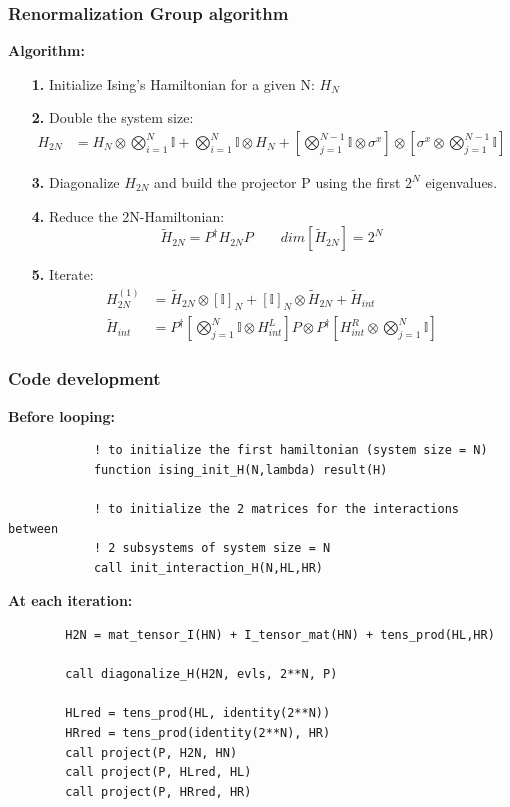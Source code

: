 \documentclass[pt12]{beamer}
\begin{document}
\begin{frame}[fragile,label=RB]
	\frametitle{Renormalization Group algorithm}
	\tableofcontents[pausesections]
	\fontsize{8pt}{10pt}\selectfont
	\textbf{Algorithm:}
	\begin{itemize}
		\item[\textbf{1.}] Initialize Ising's Hamiltonian for a given N:  $H_N$
		\item[\textbf{2.}] Double the system size:
		$$
		\begin{align}
			H_{2N} &= H_N\otimes \bigotimes_{i=1}^{N}\mathbb{I} + \bigotimes_{i=1}^{N}\mathbb{I} \otimes H_N
			       + \left[\bigotimes_{j=1}^{N-1} \mathbb{I} \otimes \sigma^x\right]\otimes\left[\sigma^x\otimes \bigotimes_{j=1}^{N-1} \mathbb{I} \right]
		\end{align}$$ 
	\item[\textbf{3.}] Diagonalize $H_{2N}$ and build the projector P using the first $2^N$ eigenvalues.
	\item[\textbf{4.}] Reduce the 2N-Hamiltonian:
	$$\tilde{H}_{2N}=P^\dagger H_{2N} P \qquad dim[\tilde{H}_{2N}] = 2^N$$
	\item[\textbf{5.}] Iterate:
	$$\begin{align}
		H_{2N}^{(1)} &= \tilde{H}_{2N} \otimes [\mathbb{I}]_N + [\mathbb{I}]_N \otimes \tilde{H}_{2N} + \tilde{H}_{int}  \\
	\tilde{H}_{int} &= P^\dagger\left[\bigotimes_{j=1}^N\mathbb{I} \otimes H^L_{int}\right]P \otimes P^\dagger\left[H^R_{int}\otimes\bigotimes_{j=1}^N\mathbb{I}\right]
	\end{align}$$
	\end{itemize}
\end{frame}

\begin{frame}[fragile,label=Code development]
	\frametitle{Code development}
	\tableofcontents[pausesections]
	\textbf{Before looping:}
		\begin{verbatim}
			! to initialize the first hamiltonian (system size = N)
			function ising_init_H(N,lambda) result(H)
			
			! to initialize the 2 matrices for the interactions between 
			! 2 subsystems of system size = N
			call init_interaction_H(N,HL,HR)
		\end{verbatim}
	\textbf{At each iteration:}
	\begin{verbatim}
		H2N = mat_tensor_I(HN) + I_tensor_mat(HN) + tens_prod(HL,HR)
				
		call diagonalize_H(H2N, evls, 2**N, P)
		
		HLred = tens_prod(HL, identity(2**N))
		HRred = tens_prod(identity(2**N), HR)
		call project(P, H2N, HN)
		call project(P, HLred, HL)
		call project(P, HRred, HR)
		
	\end{verbatim}
\end{frame}
\end{document}
